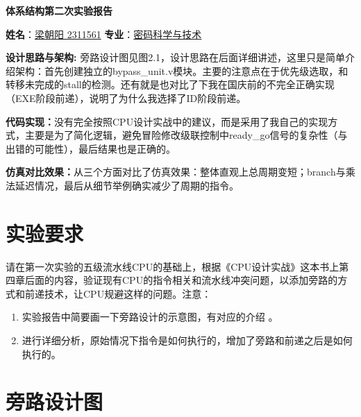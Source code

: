 \documentclass[a4paper]{article}
\begin{document}
\renewcommand{\figurename}{图}
\renewcommand{\contentsname}{目录}  
\renewcommand{\abstractname}{\textbf{\Large 摘要}} 

\begin{center}
    \huge{\textbf{体系结构第二次实验报告}}
\end{center}

\begin{center}
    \textbf{姓名}：\underline{梁朝阳 2311561} \quad
    \textbf{专业}：\underline{密码科学与技术}
\end{center}

\tableofcontents

\vspace*{1cm}


\vspace{1em}

\textbf{设计思路与架构:} 
旁路设计图见图2.1，设计思路在后面详细讲述，这里只是简单介绍架构：首先创建独立的bypass\_unit.v模块。主要的注意点在于优先级选取，和转移未完成的stall的检测。还有就是也对比了下我在国庆前的不完全正确实现（EXE阶段前递），说明了为什么我选择了ID阶段前递。

\textbf{代码实现：}没有完全按照CPU设计实战中的建议，而是采用了我自己的实现方式，主要是为了简化逻辑，避免冒险修改级联控制中ready\_go信号的复杂性（与出错的可能性），最后结果也是正确的。

\textbf{仿真对比效果：}从三个方面对比了仿真效果：整体直观上总周期变短；branch与乘法延迟情况，最后从细节举例确实减少了周期的指令。

\newpage

\section{实验要求}

请在第一次实验的五级流水线CPU的基础上，根据《CPU设计实战》这本书上第四章后面的内容，验证现有CPU的指令相关和流水线冲突问题，以添加旁路的方式和前递技术，让CPU规避这样的问题。注意：

\begin{enumerate}
    \item 实验报告中简要画一下旁路设计的示意图，有对应的介绍 。  
    \item 进行详细分析，原始情况下指令是如何执行的，增加了旁路和前递之后是如何执行的。
\end{enumerate}

\section{旁路设计图}
\end{document}
